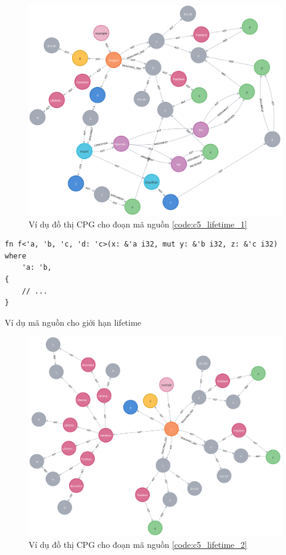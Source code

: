 \begin{figure}[H]
    \includegraphics[width=1\columnwidth]{figures/c5/c5_lifetime_1.png}
    \centering
    \caption{Ví dụ đồ thị CPG cho đoạn mã nguồn \ref{code:c5_lifetime_1}}
    \label{img:c5_lifetime_1}
\end{figure}

\begin{listing}[H]
\begin{verbatim}
fn f<'a, 'b, 'c, 'd: 'c>(x: &'a i32, mut y: &'b i32, z: &'c i32)
where
    'a: 'b,
{
    // ...
}
\end{verbatim}
\caption{Ví dụ mã nguồn cho giới hạn lifetime}
\label{code:c5_lifetime_2}
\end{listing}

\begin{figure}[H]
    \includegraphics[width=1\columnwidth]{figures/c5/c5_lifetime_2.png}
    \centering
    \caption{Ví dụ đồ thị CPG cho đoạn mã nguồn \ref{code:c5_lifetime_2}}
    \label{img:c5_lifetime_2}
\end{figure}
